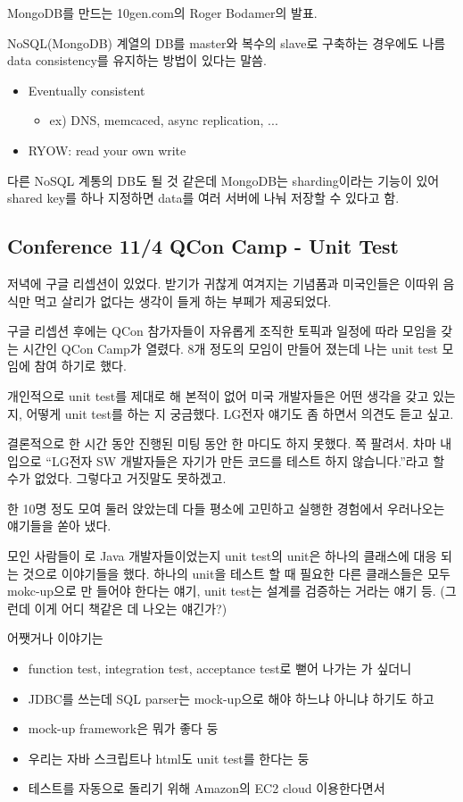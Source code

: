 \documentclass[a4paper]{article}
\begin{document}
MongoDB를 만드는 10gen.com의 Roger Bodamer의 발표.
 
NoSQL(MongoDB) 계열의 DB를 master와 복수의 slave로 구축하는 경우에도
나름 data consistency를 유지하는 방법이 있다는 말씀.
 
\begin{itemize}
\item Eventually consistent
    \begin{itemize}
    \item ex) DNS, memcaced, async replication, ...
    \end{itemize}
\item RYOW: read your own write
\end{itemize}
 
다른 NoSQL 계통의 DB도 될 것 같은데 MongoDB는 sharding이라는 기능이
있어 shared key를 하나 지정하면 data를 여러 서버에 나눠 저장할 수
있다고 함.
 
\subsection{Conference 11/4 QCon Camp - Unit Test}
 
저녁에 구글 리셉션이 있었다. 받기가 귀찮게 여겨지는 기념품과 미국인들은
이따위 음식만 먹고 살리가 없다는 생각이 들게 하는 부페가 제공되었다.
 
구글 리셉션 후에는 QCon 참가자들이 자유롭게 조직한 토픽과 일정에 따라
모임을 갖는 시간인 QCon Camp가 열렸다. 8개 정도의 모임이 만들어 졌는데
나는 unit test 모임에 참여 하기로 했다.
 
개인적으로 unit test를 제대로 해 본적이 없어 미국 개발자들은 어떤
생각을 갖고 있는 지, 어떻게 unit test를 하는 지 궁금했다.
LG전자 얘기도 좀 하면서 의견도 듣고 싶고.
 
결론적으로 한 시간 동안 진행된 미팅 동안 한 마디도 하지 못했다. 쪽
팔려서. 차마 내 입으로 ``LG전자 SW 개발자들은 자기가 만든 코드를 테스트
하지 않습니다.''라고 할 수가 없었다. 그렇다고 거짓말도 못하겠고.
 
한 10명 정도 모여 둘러 앉았는데 다들 평소에 고민하고 실행한 경험에서
우러나오는 얘기들을 쏟아 냈다.
 
모인 사람들이 로 Java 개발자들이었는지 unit test의 unit은 하나의
클래스에 대응 되는 것으로 이야기들을 했다. 하나의 unit을 테스트 할 때
필요한 다른 클래스들은 모두 mokc-up으로 만 들어야 한다는 얘기, unit
test는 설계를 검증하는 거라는 얘기 등.
(그런데 이게 어디 책같은 데 나오는 얘긴가?)
 
어쨋거나 이야기는 
\begin{itemize}
\item function test, integration test, acceptance test로 뻗어 나가는 가 싶더니 
\item JDBC를 쓰는데 SQL parser는  mock-up으로 해야 하느냐 아니냐 하기도 하고 
\item mock-up framework은 뭐가 좋다 둥 
\item 우리는 자바 스크립트나 html도 unit test를 한다는 둥
\item 테스트를 자동으로 돌리기 위해 Amazon의 EC2 cloud 이용한다면서 
\end{itemize}
 
\end{document}
